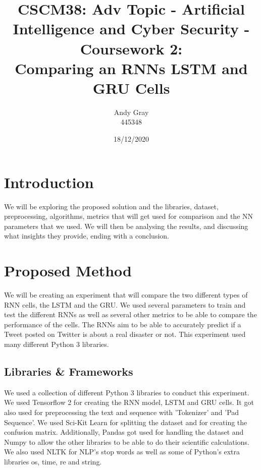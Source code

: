 \documentclass[a4paper,10pt]{article}
\begin{document}
\title{CSCM38: Adv Topic - Artificial Intelligence and Cyber Security - Coursework 2: \\ Comparing an RNNs LSTM and GRU Cells}
\author{Andy Gray\\445348}
\date{18/12/2020}

\maketitle

\section{Introduction}
\label{sec:intro}




	



	We will be exploring the proposed solution and the libraries, dataset, preprocessing, algorithms, metrics that will get used for comparison and the NN parameters that we used. We will then be analysing the results, and discussing what insights they provide, ending with a conclusion.


\section{Proposed Method}
	We will be creating an experiment that will compare the two different types of RNN cells, the LSTM and the GRU. We used several parameters to train and test the different RNNs as well as several other metrics to be able to compare the performance of the cells. The RNNs aim to be able to accurately predict if a Tweet posted on Twitter is about a real disaster or not. This experiment used many different Python 3 libraries.

\subsection{Libraries \& Frameworks}
	We used a collection of different Python 3 libraries to conduct this experiment. We used Tensorflow 2 \cite{tensorflow} for creating the RNN model, LSTM and GRU cells. It got also used for preprocessing the text and sequence with 'Tokenizer' and 'Pad Sequence'. We used Sci-Kit Learn \cite{scikit-learn} for splitting the dataset and for creating the confusion matrix. Additionally, Pandas \cite{} got used for handling the dataset and Numpy to allow the other libraries to be able to do their scientific calculations. We also used NLTK \cite{} for NLP's stop words as well as some of Python's extra libraries os, time, re and string. 
\end{document}
